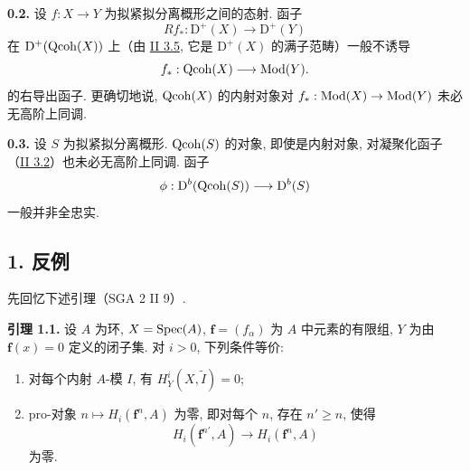 \textbf{0.2.} 设 $f:X\to Y$ 为拟紧拟分离概形之间的态射. 函子
\[
 Rf_*:\mathrm D^+(X)\longrightarrow\mathrm D^+(Y)
\]
在 $\mathrm D^+(\operatorname{Qcoh}(X))$ 上（由 \hyperlink{sga6.e02.prop.3-5}{II 3.5}, 它是 $\mathrm D^+(X)$ 的满子范畴）一般不诱导
\[
 f_*:\operatorname{Qcoh}(X)\longrightarrow\operatorname{Mod}(Y).
\]
的右导出函子. 更确切地说, $\operatorname{Qcoh}(X)$ 的内射对象对 $f_*:\operatorname{Mod}(X)\to\operatorname{Mod}(Y)$ 未必无高阶上同调.

\textbf{0.3.} 设 $S$ 为拟紧拟分离概形. $\operatorname{Qcoh}(S)$ 的对象, 即使是内射对象, 对凝聚化函子（\hyperlink{sga6.e02.lem.3-2}{II 3.2}）也未必无高阶上同调. 函子
\[
 \phi:\mathrm D^b(\operatorname{Qcoh}(S))\longrightarrow\mathrm D^b(S)
\]
一般并非全忠实.

\subsection*{1. 反例}
先回忆下述引理（SGA 2 II 9）.

\textbf{引理 1.1.} 设 $A$ 为环, $X=\operatorname{Spec}(A)$, $\mathbf f=(f_\alpha)$ 为 $A$ 中元素的有限组, $Y$ 为由 $\mathbf f(x)=0$ 定义的闭子集. 对 $i>0$, 下列条件等价:
\begin{enumerate}[label=(\roman*)]
\item 对每个内射 $A$-模 $I$, 有 $H^i_Y(X,\widetilde I)=0$;
\item pro-对象 $n\mapsto H_i(\mathbf f^n,A)$ 为零, 即对每个 $n$, 存在 $n'\geq n$, 使得
\[
 H_i(\mathbf f^{n'},A)\longrightarrow H_i(\mathbf f^n,A)
\]
为零.
\end{enumerate}

